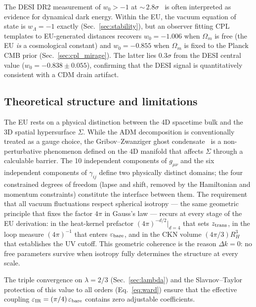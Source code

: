 \documentclass[a4paper,fleqn]{cas-dc}
\begin{document}
The DESI DR2 measurement of $w_0 > -1$ at
${\sim}\,2.8\sigma$~\cite{desi_dr2_2025} is often
interpreted as evidence for dynamical dark energy.
Within the EU, the vacuum equation of state is
$w_\Lambda = -1$ exactly (Sec.~\ref{sec:stability}),
but an observer fitting CPL templates to
EU-generated distances recovers $w_0 = -1.006$
when $\Omega_m$ is free (the EU \textit{is} a
cosmological constant) and $w_0 = -0.855$ when
$\Omega_m$ is fixed to the Planck CMB prior
(Sec.~\ref{sec:cpl_mirage}). The latter lies
$0.3\sigma$ from the DESI central value
($w_0 = -0.838 \pm 0.055$), confirming that
the DESI signal is quantitatively consistent with
a CDM drain artifact.


\subsection{Theoretical structure and limitations}
\label{sec:theory_limits}

The EU rests on a physical distinction between the 4D
spacetime bulk and the 3D spatial hypersurface $\Sigma$.
While the ADM decomposition is conventionally treated as
a gauge choice, the Gribov--Zwanziger ghost
condensate~\cite{gribov1978,zwanziger1989,vandersickel2012}
is a non-perturbative phenomenon defined on the 4D
manifold that affects $\Sigma$ through a calculable
barrier. The 10 independent components of $g_{\mu\nu}$
and the six independent components of $\gamma_{ij}$ define
two physically distinct domains; the four constrained
degrees of freedom (lapse and shift, removed by the
Hamiltonian and momentum constraints) constitute the
interface between them. The requirement that all vacuum
fluctuations respect spherical isotropy --- the same
geometric principle that fixes the factor $4\pi$ in
Gauss's law --- recurs at every stage of the EU
derivation: in the heat-kernel prefactor
$(4\pi)^{-d/2}|_{d=4}$ that sets $z_{\rm trans}$,
in the loop measure $(4\pi)^{-1}$ that enters
$\varepsilon_{\rm bare}$, and in the CKN volume
$(4\pi/3)R_H^3$ that establishes the UV cutoff.
This geometric coherence is the reason
$\Delta k = 0$: no free parameters survive when
isotropy fully determines the structure at every scale.

The triple convergence on $\lambda = 2/3$
(Sec.~\ref{sec:lambda}) and the Slavnov--Taylor
protection of this value to all orders
(Eq.~\ref{eq:ward}) ensure that the effective coupling
$\varepsilon_{\rm IR} = (\pi/4)\,\varepsilon_{\rm bare}$
contains zero adjustable coefficients.
\end{document}

